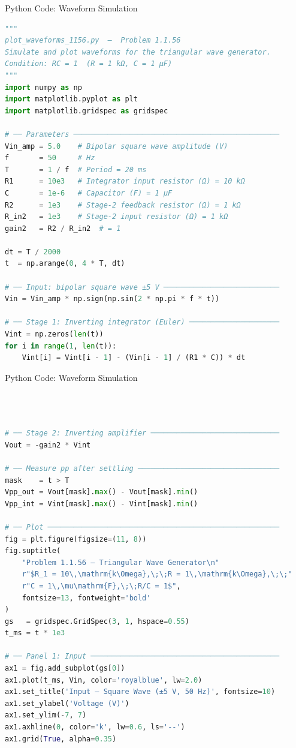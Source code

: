 \documentclass{beamer}
\numberwithin{equation}{section}
\theoremstyle{remark}
\begin{document}
\begin{frame}[fragile]{Python Code: Waveform Simulation}

\begin{lstlisting}[language=Python]
"""
plot_waveforms_1156.py  —  Problem 1.1.56 
Simulate and plot waveforms for the triangular wave generator.
Condition: RC = 1  (R = 1 kΩ, C = 1 µF)
"""
import numpy as np
import matplotlib.pyplot as plt
import matplotlib.gridspec as gridspec

# ── Parameters ────────────────────────────────────────────────
Vin_amp = 5.0    # Bipolar square wave amplitude (V)
f       = 50     # Hz
T       = 1 / f  # Period = 20 ms
R1      = 10e3   # Integrator input resistor (Ω) = 10 kΩ
C       = 1e-6   # Capacitor (F) = 1 µF
R2      = 1e3    # Stage-2 feedback resistor (Ω) = 1 kΩ
R_in2   = 1e3    # Stage-2 input resistor (Ω) = 1 kΩ
gain2   = R2 / R_in2  # = 1

dt = T / 2000
t  = np.arange(0, 4 * T, dt)

# ── Input: bipolar square wave ±5 V ───────────────────────────
Vin = Vin_amp * np.sign(np.sin(2 * np.pi * f * t))

# ── Stage 1: Inverting integrator (Euler) ─────────────────────
Vint = np.zeros(len(t))
for i in range(1, len(t)):
    Vint[i] = Vint[i - 1] - (Vin[i - 1] / (R1 * C)) * dt

\end{lstlisting}


\end{frame}


\begin{frame}[fragile]{Python Code: Waveform Simulation}

\begin{lstlisting}[language=Python]



# ── Stage 2: Inverting amplifier ──────────────────────────────
Vout = -gain2 * Vint

# ── Measure pp after settling ─────────────────────────────────
mask    = t > T
Vpp_out = Vout[mask].max() - Vout[mask].min()
Vpp_int = Vint[mask].max() - Vint[mask].min()

# ── Plot ──────────────────────────────────────────────────────
fig = plt.figure(figsize=(11, 8))
fig.suptitle(
    "Problem 1.1.56 — Triangular Wave Generator\n"
    r"$R_1 = 10\,\mathrm{k\Omega},\;\;R = 1\,\mathrm{k\Omega},\;\;"
    r"C = 1\,\mu\mathrm{F},\;\;R/C = 1$",
    fontsize=13, fontweight='bold'
)
gs   = gridspec.GridSpec(3, 1, hspace=0.55)
t_ms = t * 1e3

# ── Panel 1: Input ────────────────────────────────────────────
ax1 = fig.add_subplot(gs[0])
ax1.plot(t_ms, Vin, color='royalblue', lw=2.0)
ax1.set_title('Input — Square Wave (±5 V, 50 Hz)', fontsize=10)
ax1.set_ylabel('Voltage (V)')
ax1.set_ylim(-7, 7)
ax1.axhline(0, color='k', lw=0.6, ls='--')
ax1.grid(True, alpha=0.35)

\end{lstlisting}


\end{frame}
\end{document}
